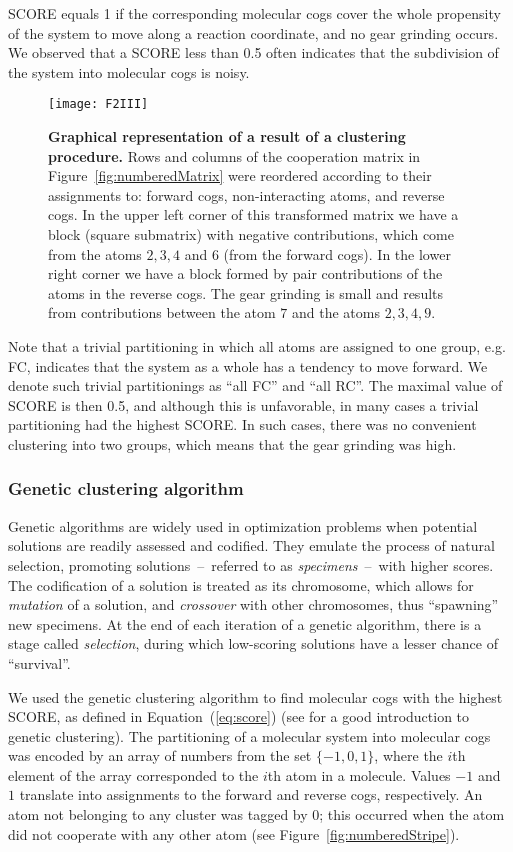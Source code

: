 \documentclass[a4paper,11pt,twoside]{book}%
\begin{document}
SCORE equals 1 if the corresponding molecular cogs cover the whole propensity of the system to move along a reaction coordinate, and no gear grinding occurs.
We observed that a SCORE less than 0.5 often indicates that the subdivision of the system into molecular cogs is noisy.

\begin{figure}[h!]
\centering
\texttt{[image: F2III]}
\caption{
{\bf Graphical representation of a result of a clustering procedure.}
Rows and columns of the cooperation matrix in Figure~\ref{fig:numberedMatrix} were reordered according to their assignments to: forward cogs, non-interacting atoms, and reverse cogs.	
In the upper left corner of this transformed matrix we have a block (square submatrix) with negative contributions, which come from the atoms $2, 3, 4$ and $6$ (from the forward cogs).
In the lower right corner we have a block formed by pair contributions of the atoms in the reverse cogs.
The gear grinding is small and results from contributions between the atom $7$ and the atoms ${2, 3, 4, 9}$.
}
\label{fig:numberedMatrixClustered}
\end{figure}

Note that a trivial partitioning in which all atoms are assigned to one group, e.g. FC, indicates that the system as a whole has a tendency to move forward.
We denote such trivial partitionings as ``all FC'' and ``all RC''.
The maximal value of SCORE is then 0.5, and although this is unfavorable, in many cases a trivial partitioning had the highest SCORE.
In such cases, there was no convenient clustering into two groups, which means that the gear grinding was high.

\subsubsection{Genetic clustering algorithm}\label{sec:genetic}
Genetic algorithms are widely used in optimization problems when potential solutions are readily assessed and codified.
They emulate the process of natural selection, promoting solutions~--~referred to as \emph{specimens}~--~with higher scores.
The codification of a solution is treated as its chromosome, which allows for \emph{mutation} of a solution, and \emph{crossover} with other chromosomes, thus ``spawning'' new specimens.
At the end of each iteration of a genetic algorithm, there is a stage called \emph{selection}, during which low-scoring solutions have a lesser chance of ``survival''.

We used the genetic clustering algorithm to find molecular cogs with the highest SCORE, as defined in Equation~(\ref{eq:score}) (see \cite{cole1998clustering} for a good introduction to genetic clustering).
The partitioning of a molecular system into molecular cogs was encoded by an array of numbers from the set \mbox{$\{-1,0,1\}$}, where the $i$th element of the array corresponded to the $i$th atom in a molecule.
Values $-1$ and $1$ translate into assignments to the forward and reverse cogs, respectively.
An atom not belonging to any cluster was tagged by 0; this occurred when the atom did not cooperate with any other atom {\color{black}(see Figure~\ref{fig:numberedStripe})}.
\end{document}
